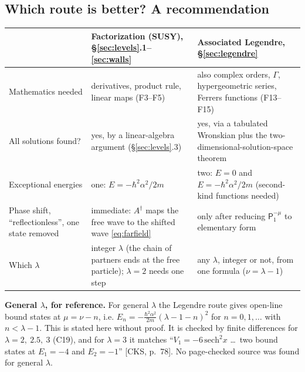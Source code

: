 \documentclass[11pt]{article}
\numberwithin{equation}{section}
\newcommand{\Ad}{A^{\dagger}}
\newcommand{\Eu}{\hbar^2\alpha^2/2m}
\newcommand{\chk}[1]{{\footnotesize\textsf{(#1)}}}
\begin{document}
\subsection{Which route is better? A recommendation}
\label{sec:routes}
\begin{center}
\small
\begin{tabular}{p{}p{}p{}}
\toprule
 & Factorization (SUSY), \S\ref{sec:levels}.1--\ref{sec:walls} & Associated Legendre, \S\ref{sec:legendre}\\
\midrule
Mathematics needed & derivatives, product rule, linear maps (F3--F5) & also complex orders, $\Gamma$, hypergeometric series, Ferrers functions (F13--F15)\\
All solutions found? & yes, by a linear-algebra argument (\S\ref{sec:levels}.3) & yes, via a tabulated Wronskian plus the two-dimensional-solution-space theorem\\
Exceptional energies & one: $E=-\Eu$ & two: $E=0$ and $E=-\Eu$ (second-kind functions needed)\\
Phase shift, ``reflectionless'', one state removed & immediate: $\Ad$ maps the free wave to the shifted wave \eqref{eq:farfield} & only after reducing $\mathsf P_1^{-\mu}$ to elementary form\\
Which $\lambda$ & integer $\lambda$ (the chain of partners ends at the free particle); $\lambda=2$ needs one step & any $\lambda$, integer or not, from one formula ($\nu=\lambda-1$)\\
\bottomrule
\end{tabular}
\end{center}

\textbf{General $\lambda$, for reference.} For general $\lambda$ the Legendre route gives open-line bound states at $\mu=\nu-n$, i.e.
$E_n=-\frac{\hbar^2\alpha^2}{2m}(\lambda-1-n)^2$ for $n=0,1,\dots$ with $n<\lambda-1$. This is stated here without proof. It is checked by finite differences for $\lambda=2,\ 2.5,\ 3$ \chk{C19}, and for $\lambda=3$ it matches ``$V_1=-6\,\mathrm{sech}^2x$ \dots\ two bound states at $E_1=-4$ and $E_2=-1$'' [CKS, p.~78]. No page-checked source was found for general $\lambda$.
\end{document}
